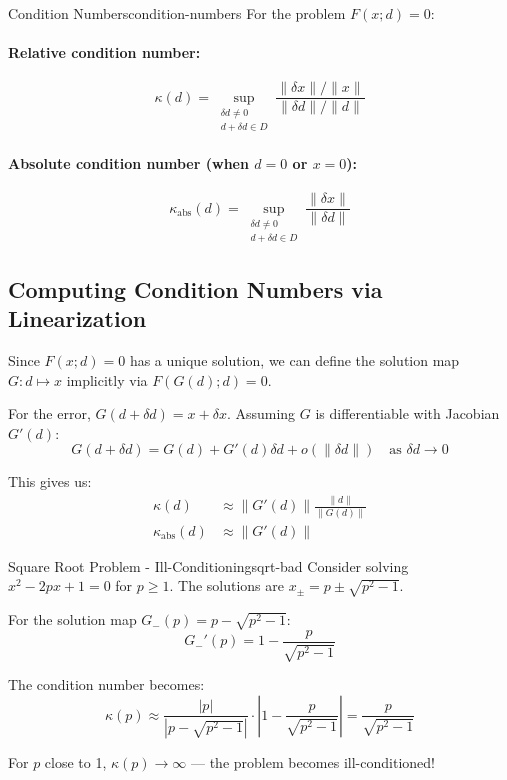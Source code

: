 \begin{definition}{Condition Numbers}{condition-numbers}
    For the problem $F(x; d) = 0$:

    \paragraph{Relative condition number:}
    \[
        \kappa(d) = \sup_{\substack{\delta d \neq 0 \\ d + \delta d \in D}} \frac{\|\delta x\|/\|x\|}{\|\delta d\|/\|d\|}
    \]

    \paragraph{Absolute condition number (when $d = 0$ or $x = 0$):}
    \[
        \kappa_{\text{abs}}(d) = \sup_{\substack{\delta d \neq 0 \\ d + \delta d \in D}} \frac{\|\delta x\|}{\|\delta d\|}
    \]
\end{definition}

\subsection{Computing Condition Numbers via Linearization}
\label{subsec:condition-computation}

Since $F(x; d) = 0$ has a unique solution, we can define the solution map $G: d \mapsto x$ implicitly via $F(G(d); d) = 0$.

For the error, $G(d + \delta d) = x + \delta x$. Assuming $G$ is differentiable with Jacobian $G'(d)$:
\[
    G(d + \delta d) = G(d) + G'(d)\delta d + o(\|\delta d\|) \quad \text{as } \delta d \to 0
\]

This gives us:
\[
    \boxed{
        \begin{aligned}
            \kappa(d)              & \approx \|G'(d)\| \frac{\|d\|}{\|G(d)\|} \\
            \kappa_{\text{abs}}(d) & \approx \|G'(d)\|
        \end{aligned}
    }
\]

\begin{example}{Square Root Problem - Ill-Conditioning}{sqrt-bad}
    Consider solving $x^2 - 2px + 1 = 0$ for $p \geq 1$. The solutions are $x_\pm = p \pm \sqrt{p^2 - 1}$.

    For the solution map $G_-(p) = p - \sqrt{p^2 - 1}$:
    \[
        G_-'(p) = 1 - \frac{p}{\sqrt{p^2 - 1}}
    \]

    The condition number becomes:
    \[
        \kappa(p) \approx \frac{|p|}{|p - \sqrt{p^2 - 1}|} \cdot \left|1 - \frac{p}{\sqrt{p^2 - 1}}\right| = \frac{p}{\sqrt{p^2 - 1}}
    \]

    For $p$ close to 1, $\kappa(p) \to \infty$ — the problem becomes ill-conditioned!
\end{example}

